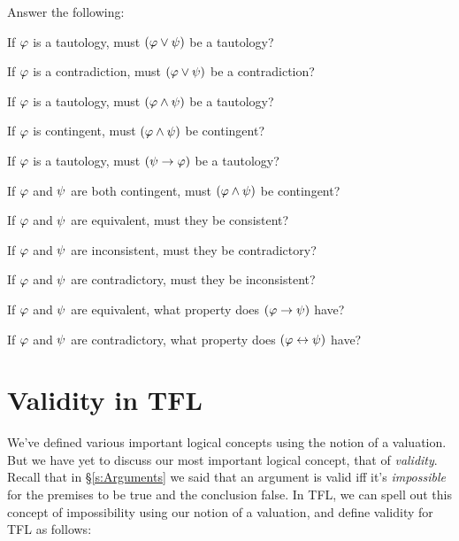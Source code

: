 \problempart Answer the following:
\begin{earg}
\item If $\mathcal{\varphi}$ is a tautology, must $(\mathcal{\varphi} \vee \mathcal{\psi})$ be a tautology?
\item If $\mathcal{\varphi}$ is a contradiction, must $(\mathcal{\varphi} \vee \mathcal{\psi})$ be a contradiction?
\item If $\mathcal{\varphi}$ is a tautology, must $(\mathcal{\varphi} \wedge  \mathcal{\psi})$ be a tautology?
\item If $\mathcal{\varphi}$ is contingent, must $(\mathcal{\varphi} \wedge  \mathcal{\psi})$ be contingent?
\item If $\mathcal{\varphi}$ is a tautology, must $(\mathcal{\psi} \rightarrow \mathcal{\varphi})$ be a tautology?
\item If $\mathcal{\varphi}$ and $\mathcal{\psi}$ are both contingent, must $(\mathcal{\varphi} \wedge  \mathcal{\psi})$ be contingent?
\item If $\mathcal{\varphi}$ and $\mathcal{\psi}$ are equivalent, must they be consistent?  
\item If $\mathcal{\varphi}$ and $\mathcal{\psi}$ are inconsistent, must they be contradictory?
\item If $\mathcal{\varphi}$ and $\mathcal{\psi}$ are contradictory, must they be inconsistent?
\item If $\mathcal{\varphi}$ and $\mathcal{\psi}$ are equivalent, what property does $(\mathcal{\varphi} \rightarrow \mathcal{\psi})$ have?  
\item If $\mathcal{\varphi}$ and $\mathcal{\psi}$ are contradictory, what property does $(\mathcal{\varphi} \leftrightarrow \mathcal{\psi})$ have?

\end{earg}


\section{Validity in TFL}

We've defined various important logical concepts using the notion of a valuation.  But we have yet to discuss our most important logical concept, that of \emph{validity}.  Recall that in \S\ref{s:Arguments} we said that an argument is valid iff it's \emph{impossible} for the premises to be true and the conclusion false.  In TFL, we can spell out this concept of impossibility using our notion of a valuation, and define validity for TFL as follows:


